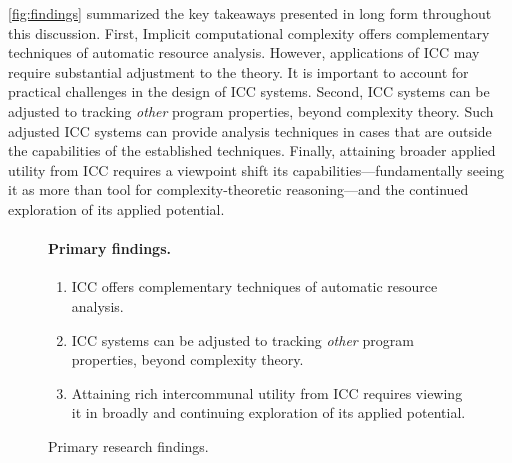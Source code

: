 \autoref{fig:findings} summarized the key takeaways presented in long form throughout this discussion.
First, Implicit computational complexity offers complementary techniques of automatic resource analysis.
However, applications of ICC may require substantial adjustment to the theory.
It is important to account for practical challenges in the design of ICC systems.
Second, ICC systems can be adjusted to tracking \emph{other} program properties, beyond complexity theory.
Such adjusted ICC systems can provide analysis techniques in cases that are outside the capabilities of the established techniques.
Finally, attaining broader applied utility from ICC requires a viewpoint shift \wrt its capabilities---\ie fundamentally seeing it as more than tool for complexity-theoretic reasoning---and the continued exploration of its applied potential.

\begin{figure}[h]
\begin{mdframed} %
\paragraph*{Primary findings.}
\begin{enumerate}[wide, labelwidth=!, labelindent=0pt]
\item ICC offers complementary techniques of automatic resource analysis.
\item ICC systems can be adjusted to tracking \emph{other} program properties, beyond complexity theory.
\item Attaining rich intercommunal utility from ICC requires viewing it in broadly and continuing exploration of its applied potential.
\end{enumerate}
\end{mdframed}
\caption[Primary research findings summarized]{Primary research findings.}
\label{fig:findings}
\end{figure}

